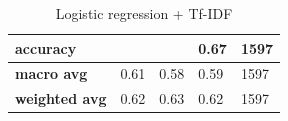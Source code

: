 \begin{table}[!ht]
{\begin{tabular}{lllll}
		\multicolumn{1}{|l|}{\textbf{accuracy}}               & \multicolumn{1}{l|}{}                   & \multicolumn{1}{l|}{}                & \multicolumn{1}{l|}{0.67}        & \multicolumn{1}{l|}{1597}             \\ \hline
		\multicolumn{1}{|l|}{\textbf{macro avg}}              & \multicolumn{1}{l|}{0.61}               & \multicolumn{1}{l|}{0.58}            & \multicolumn{1}{l|}{0.59}        & \multicolumn{1}{l|}{1597}             \\ \hline
		\multicolumn{1}{|l|}{\textbf{weighted avg}}           & \multicolumn{1}{l|}{0.62}               & \multicolumn{1}{l|}{0.63}            & \multicolumn{1}{l|}{0.62}        & \multicolumn{1}{l|}{1597}             \\ \hline
		\end{tabular}
	}
	\caption{Logistic regression + Tf-IDF}
	\label{tab:lr+tfidf}
\end{table}


